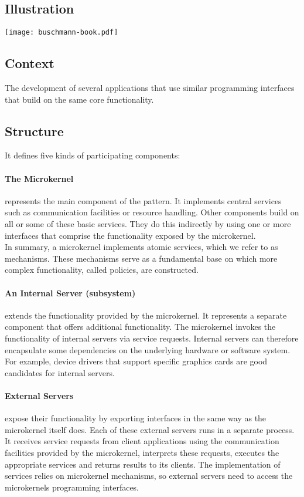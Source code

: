 \documentclass[a4paper,11pt,twocolumn]{report}
\begin{document}
    \subsection{Illustration}
    \texttt{[image: buschmann-book.pdf]}
    \subsection{Context}
    The development of several applications that use similar programming
    interfaces that build on the same core functionality.
    \subsection{Structure}
    It defines five kinds of participating components:
    \paragraph{The Microkernel} represents the main component of the pattern.
    It implements central services such as communication facilities or resource
    handling. Other components build on all or some of these basic services.
    They do this indirectly by using one or more interfaces that comprise the
    functionality exposed by the microkernel.\\
    In summary, a microkernel implements atomic services, which we refer to as
    mechanisms. These mechanisms serve as a fundamental base on which more
    complex functionality, called policies, are constructed.
    \paragraph{An Internal Server (subsystem)} extends the functionality
    provided by the microkernel. It represents a separate component that
    offers additional functionality. The microkernel invokes the functionality
    of internal servers via service requests. Internal servers can therefore
    encapsulate some dependencies on the underlying hardware or software
    system. For example, device drivers that support specific graphics cards
    are good candidates for internal servers.
    \paragraph{External Servers} expose their functionality by exporting
    interfaces in the same way as the microkernel itself does. Each of these
    external servers runs in a separate process. It receives service requests
    from client applications using the communication facilities provided by the
    microkernel, interprets these requests, executes the appropriate services
    and returns results to its clients. The implementation of services relies
    on microkernel mechanisms, so external servers need to access the
    microkernels programming interfaces.
\end{document}
